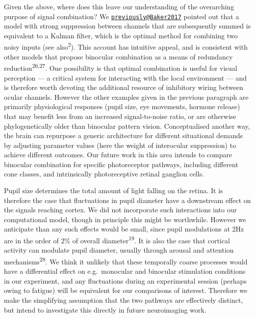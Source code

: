 \documentclass[
]{article}
\begin{document}
Given the above, where does this leave our understanding of the overarching purpose of signal combination? We \href{mailto:previously@Baker2017}{\nolinkurl{previously@Baker2017}} pointed out that a model with strong suppression between channels that are subsequently summed is equivalent to a Kalman filter, which is the optimal method for combining two noisy inputs (see also\textsuperscript{2}). This account has intuitive appeal, and is consistent with other models that propose binocular combination as a means of redundancy reduction\textsuperscript{26,27}. One possibility is that optimal combination is useful for visual perception --- a critical system for interacting with the local environment --- and is therefore worth devoting the additional resource of inhibitory wiring between ocular channels. However the other examples given in the previous paragraph are primarily physiological responses (pupil size, eye movements, hormone release) that may benefit less from an increased signal-to-noise ratio, or are otherwise phylogenetically older than binocular pattern vision. Conceptualised another way, the brain can repurpose a generic architecture for different situational demands by adjusting parameter values (here the weight of interocular suppression) to achieve different outcomes. Our future work in this area intends to compare binocular combination for specific photoreceptor pathways, including different cone classes, and intrinsically photoreceptive retinal ganglion cells.

Pupil size determines the total amount of light falling on the retina. It is therefore the case that fluctuations in pupil diameter have a downstream effect on the signals reaching cortex. We did not incorporate such interactions into our computational model, though in principle this might be worthwhile. However we anticipate than any such effects would be small, since pupil modulations at 2Hz are in the order of 2\% of overall diameter\textsuperscript{19}. It is also the case that cortical activity can modulate pupil diameter, usually through arousal and attention mechanisms\textsuperscript{28}. We think it unlikely that these temporally coarse processes would have a differential effect on e.g.~monocular and binocular stimulation conditions in our experiment, and any fluctuations during an experimental session (perhaps owing to fatigue) will be equivalent for our comparisons of interest. Therefore we make the simplifying assumption that the two pathways are effectively distinct, but intend to investigate this directly in future neuroimaging work.
\end{document}
